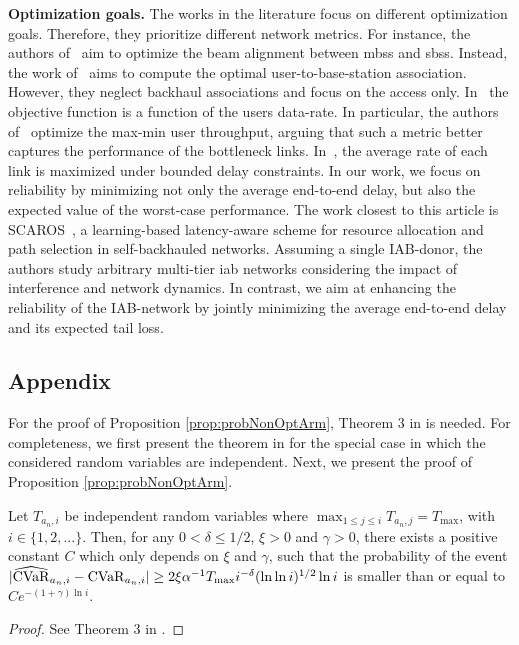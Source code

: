 \textbf{Optimization goals.} The works in the literature focus on different optimization goals. Therefore, they prioritize different network metrics. For instance, the authors of~\cite{hur2013millimeter} aim to optimize the beam alignment between \glspl{mbs} and \glspl{sbs}. Instead, the work of~\cite{alizadeh2019load} aims to compute the optimal user-to-base-station association. However, they neglect backhaul associations and focus on the access only. In~\cite{kwon2019joint, alizadeh2019load, zhu2016qos, yuan2018optimal} the objective function is a function of the users data-rate. In particular, the authors of~\cite{yuan2018optimal} optimize the max-min user throughput, arguing that such a metric better captures the performance of the bottleneck links. In~\cite{vu2018path}, the average rate of each link is maximized under bounded delay constraints. In our work, we focus on reliability by minimizing not only the average end-to-end delay, but also the expected value of the worst-case performance.
The work closest to this article is SCAROS~\cite{ortiz2019scaros},  a learning-based latency-aware scheme for resource allocation and path selection in self-backhauled networks. Assuming a single IAB-donor, the authors study arbitrary multi-tier \gls{iab} networks considering the impact of interference and network dynamics. In contrast, we aim at enhancing the reliability of the IAB-network by jointly minimizing the average end-to-end delay and its expected tail loss. 

\subsection*{Appendix}
\label{sec:appendix}
For the proof of Proposition \ref{prop:probNonOptArm}, Theorem 3 in \cite{Luo2017} is needed. For completeness, we first present the theorem in \cite{Luo2017} for the special case in which the considered random variables are independent. Next, we present the proof of Proposition \ref{prop:probNonOptArm}.
\begin{theorem} \label{eq:Theorem2_part2}
Let $T_{a_n,i}$ be independent random variables where $\max_{1\leq j\leq i}{T_{a_n,j}} = T_\mathrm{max}$, with $i\in\{1,2,...\}$.
Then, for any $0 < \delta \leq 1/2$, $\xi > 0$ and $\gamma > 0$, there exists a positive constant $C$ which only depends on $\xi$ and $\gamma$, such that the probability of the event $|{\widehat{\mathrm{CVaR}}}_{a_n,i}-{\mathrm{CVaR}}_{a_n,i}| \geq 2\xi\alpha^{-1}T_{\max} i^{-\delta}(\ln{\ln{i}})^{1/2}\ln{i}$ is smaller than or equal to $Ce^{-(1+\gamma)\ln i}$.
\end{theorem}
\begin{proof}
See Theorem 3 in \cite{Luo2017}.
\end{proof}

